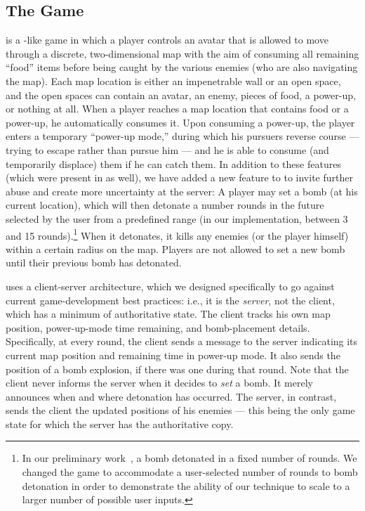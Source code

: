 \subsection{The Game}

\capman is a \pacman-like game in which a player controls an avatar
that is allowed to move through a discrete, two-dimensional map with
the aim of consuming all remaining ``food'' items before being caught
by the various enemies (who are also navigating the map).  Each map
location is either an impenetrable wall or an open space, and the open
spaces can contain an avatar, an enemy, pieces of food, a power-up, or
nothing at all.  When a player reaches a map location that contains
food or a power-up, he automatically consumes it.  Upon consuming a
power-up, the player enters a temporary ``power-up mode,'' during
which his pursuers reverse course --- trying to escape rather than
pursue him --- and he is able to consume (and temporarily displace)
them if he can catch them.  In addition to these features (which were
present in \pacman as well), we have added a new feature to \capman to
invite further abuse and create more uncertainty at the server: A
player may set a bomb (at his current location), which will then
detonate a number rounds in the future selected by the user from a
predefined range (in our implementation, between 3 and 15
rounds).\footnote{In our preliminary work~\cite{bethea10:games}, a
  bomb detonated in a fixed number of rounds.  We changed the game to
  accommodate a user-selected number of rounds to bomb detonation in
  order to demonstrate the ability of our technique to scale to a
  larger number of possible user inputs.}  When it detonates, it kills
any enemies (or the player himself) within a certain radius on the
map.  Players are not allowed to set a new bomb until their previous
bomb has detonated.

\capman uses a client-server architecture, which we designed
specifically to go against current game-development best practices:
i.e., it is the {\em server}, not the client, which has a minimum of
authoritative state.  The client tracks his own map position,
power-up-mode time remaining, and bomb-placement details.
Specifically, at every round, the client sends a message to the server
indicating its current map position and remaining time in power-up
mode.  It also sends the position of a bomb explosion, if there was
one during that round.  Note that the client never informs the server
when it decides to {\em set} a bomb.  It merely announces when and
where detonation has occurred.  The server, in contrast, sends the
client the updated positions of his enemies --- this being the only
game state for which the server has the authoritative copy.

